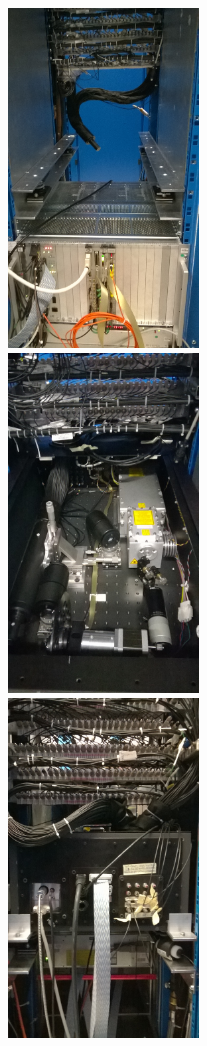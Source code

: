 \begin{figure}[htbp]
\begin{center} 
\includegraphics[width=5.8cm, height=9cm]{figures/WP_20141009_15_37_36_Pro}
\includegraphics[width=5.8cm, height=9cm]{figures/WP_20141009_16_17_31_Pro}
\includegraphics[width=5.8cm, height=9cm]{figures/WP_20141010_12_11_55_Pro}

\end{center}
\end{figure}
